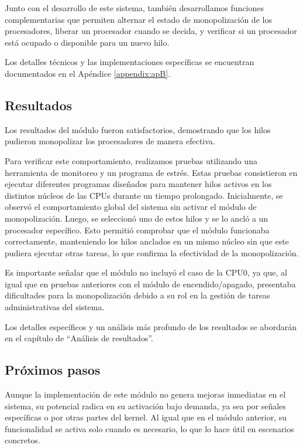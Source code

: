 Junto con el desarrollo de este sistema, también desarrollamos funciones complementarias que permiten alternar el estado de monopolización de los procesadores, liberar un procesador cuando se decida, y verificar si un procesador está ocupado o disponible para un nuevo hilo.\par

Los detalles técnicos y las implementaciones específicas se encuentran documentados en el Apéndice \ref{appendix:apB}.\par

\subsection{Resultados}

Los resultados del módulo fueron satisfactorios, demostrando que los hilos pudieron monopolizar los procesadores de manera efectiva.\par

Para verificar este comportamiento, realizamos pruebas utilizando una herramienta de monitoreo y un programa de estrés. Estas pruebas consistieron en ejecutar diferentes programas diseñados para mantener hilos activos en los distintos núcleos de las CPUs durante un tiempo prolongado. Inicialmente, se observó el comportamiento global del sistema sin activar el módulo de monopolización. Luego, se seleccionó uno de estos hilos y se lo ancló a un procesador específico. Esto permitió comprobar que el módulo funcionaba correctamente, manteniendo los hilos anclados en un mismo núcleo sin que este pudiera ejecutar otras tareas, lo que confirma la efectividad de la monopolización.\par

Es importante señalar que el módulo no incluyó el caso de la CPU0, ya que, al igual que en pruebas anteriores con el módulo de encendido/apagado, presentaba dificultades para la monopolización debido a su rol en la gestión de tareas administrativas del sistema.\par

Los detalles específicos y un análisis más profundo de los resultados se abordarán en el capítulo de “Análisis de resultados”.\par

\subsection{Próximos pasos}

Aunque la implementación de este módulo no genera mejoras inmediatas en el sistema, su potencial radica en su activación bajo demanda, ya sea por señales específicas o por otras partes del kernel. Al igual que en el módulo anterior, su funcionalidad se activa solo cuando es necesario, lo que lo hace útil en escenarios concretos.\par

